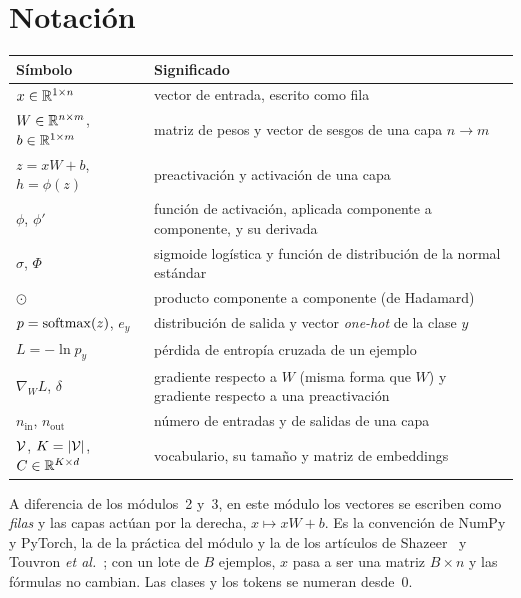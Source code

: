 \documentclass[11pt,a4paper,twoside,openany]{book}
\newcommand{\nin}{n_{\mathrm{in}}}
\newcommand{\nout}{n_{\mathrm{out}}}
\begin{document}
\section*{Notación}
\begin{center}\small
\begin{tabularx}{\textwidth}{@{}l>{\raggedright\arraybackslash}X@{}}
\toprule
Símbolo & Significado \\
\midrule
$x\in\mathbb{R}^{1\times n}$ & vector de entrada, escrito como fila \\
$W\in\mathbb{R}^{n\times m}$, $b\in\mathbb{R}^{1\times m}$ & matriz de pesos y vector de sesgos de una capa $n\to m$ \\
$z=xW+b$, $h=\phi(z)$ & preactivación y activación de una capa \\
$\phi$, $\phi'$ & función de activación, aplicada componente a componente, y su derivada \\
$\sigma$, $\Phi$ & sigmoide logística y función de distribución de la normal estándar \\
$\odot$ & producto componente a componente (de Hadamard) \\
$p=\operatorname{softmax}(z)$, $e_y$ & distribución de salida y vector \emph{one-hot} de la clase $y$ \\
$L=-\ln p_y$ & pérdida de entropía cruzada de un ejemplo \\
$\nabla_{\!W}L$, $\delta$ & gradiente respecto a $W$ (misma forma que $W$) y gradiente respecto a una preactivación \\
$\nin$, $\nout$ & número de entradas y de salidas de una capa \\
$\mathcal{V}$, $K=\lvert\mathcal{V}\rvert$, $C\in\mathbb{R}^{K\times d}$ & vocabulario, su tamaño y matriz de embeddings \\
\bottomrule
\end{tabularx}
\end{center}

A diferencia de los módulos~2 y~3, en este módulo los vectores se escriben como \emph{filas} y las capas actúan por la derecha, $x\mapsto xW+b$. Es la convención de NumPy y PyTorch, la de la práctica del módulo y la de los artículos de Shazeer~\cite{shazeer} y Touvron \emph{et al.}~\cite{touvron}; con un lote de $B$ ejemplos, $x$ pasa a ser una matriz $B\times n$ y las fórmulas no cambian. Las clases y los tokens se numeran desde~0.


\tableofcontents

\mainmatter







\backmatter

\end{document}
